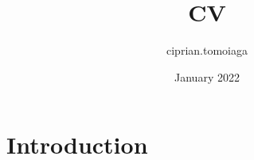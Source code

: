 \documentclass{article}
\title{CV}
\author{ciprian.tomoiaga }
\date{January 2022}
\begin{document}
\maketitle

\section{Introduction}
\end{document}

